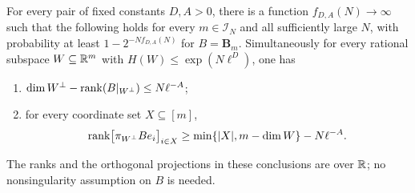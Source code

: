 \begin{proposition}\label{prop:typical-ranks}
For every pair of fixed constants \(D,A>0\), there is a function
\(f_{D,A}(N)\to\infty\) such that the following holds for every
\(m\in\mathcal I_N\) and all sufficiently large \(N\), with probability
at least \(1-2^{-Nf_{D,A}(N)}\) for \(B=\mathbf B_m\).
Simultaneously for every rational subspace \(W\subseteq\mathbb R^m\) with
\(H(W)\le\exp(N\ell^D)\), one has
\begin{enumerate}
 \item
 \(\dim W^\perp-\operatorname{rank}(B|_{W^\perp})\le N\ell^{-A}\);
 \item for every coordinate set \(X\subseteq[m]\),
 \[
  \operatorname{rank}\bigl[\pi_{W^\perp}Be_i\bigr]_{i\in X}
  \ge \min\{|X|,m-\dim W\}-N\ell^{-A}.
 \]
\end{enumerate}
The ranks and the orthogonal projections in these conclusions are
over \(\mathbb R\); no nonsingularity assumption on \(B\) is needed.
\end{proposition}

